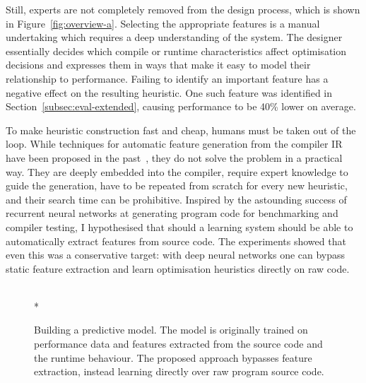 Still, experts are not completely removed from the design process, which is shown in Figure~\ref{fig:overview-a}. Selecting the appropriate features is a manual undertaking which requires a deep understanding of the system. The designer essentially decides which compile or runtime characteristics affect optimisation decisions and expresses them in ways that make it easy to model their relationship to performance. Failing to identify an important feature has a negative effect on the resulting heuristic. One such feature was identified in Section~\ref{subsec:eval-extended}, causing performance to be 40\% lower on average.

To make heuristic construction fast and cheap, humans must be taken out of the loop. While techniques for automatic feature generation from the compiler IR have been proposed in the past~\cite{Namolaru2010a,Leather2014}, they do not solve the problem in a practical way. They are deeply embedded into the compiler, require expert knowledge to guide the generation, have to be repeated from scratch for every new heuristic, and their search time can be prohibitive. Inspired by the astounding success of recurrent neural networks at generating program code for benchmarking and compiler testing, I hypothesised that should a learning system should be able to automatically extract features from source code. The experiments showed that even this was a conservative target: with deep neural networks one can bypass static feature extraction and learn optimisation heuristics directly on raw code.

\begin{figure}[t!]
	\centering
	\\*%
	\caption[Using machine learning for compiler optimisations]{%
		Building a predictive model. The model is originally trained on performance data and features extracted from the source code and the runtime behaviour. The proposed approach bypasses feature extraction, instead learning directly over raw program source code.%
	}%
	\label{fig:overview}
\end{figure}

